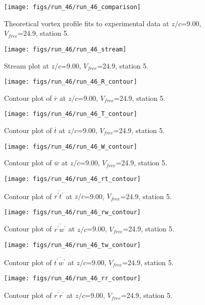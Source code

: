 \begin{figure}[H]
\centering
\texttt{[image: figs/run\_46/run\_46\_comparison]}
\caption{Theoretical vortex profile fits to experimental data at $z/c$=9.00, $V_{free}$=24.9, station 5.}
\end{figure}


\begin{figure}[H]
\centering
\texttt{[image: figs/run\_46/run\_46\_stream]}
\caption{Stream plot at $z/c$=9.00, $V_{free}$=24.9, station 5.}
\end{figure}


\begin{figure}[H]
\centering
\texttt{[image: figs/run\_46/run\_46\_R\_contour]}
\caption{Contour plot of $\overline{r}$ at $z/c$=9.00, $V_{free}$=24.9, station 5.}
\end{figure}


\begin{figure}[H]
\centering
\texttt{[image: figs/run\_46/run\_46\_T\_contour]}
\caption{Contour plot of $\overline{t}$ at $z/c$=9.00, $V_{free}$=24.9, station 5.}
\end{figure}


\begin{figure}[H]
\centering
\texttt{[image: figs/run\_46/run\_46\_W\_contour]}
\caption{Contour plot of $\overline{w}$ at $z/c$=9.00, $V_{free}$=24.9, station 5.}
\end{figure}


\begin{figure}[H]
\centering
\texttt{[image: figs/run\_46/run\_46\_rt\_contour]}
\caption{Contour plot of $\overline{r^\prime t^\prime}$ at $z/c$=9.00, $V_{free}$=24.9, station 5.}
\end{figure}


\begin{figure}[H]
\centering
\texttt{[image: figs/run\_46/run\_46\_rw\_contour]}
\caption{Contour plot of $\overline{r^\prime w^\prime}$ at $z/c$=9.00, $V_{free}$=24.9, station 5.}
\end{figure}


\begin{figure}[H]
\centering
\texttt{[image: figs/run\_46/run\_46\_tw\_contour]}
\caption{Contour plot of $\overline{t^\prime w^\prime}$ at $z/c$=9.00, $V_{free}$=24.9, station 5.}
\end{figure}


\begin{figure}[H]
\centering
\texttt{[image: figs/run\_46/run\_46\_rr\_contour]}
\caption{Contour plot of $\overline{r^\prime r^\prime}$ at $z/c$=9.00, $V_{free}$=24.9, station 5.}
\end{figure}


